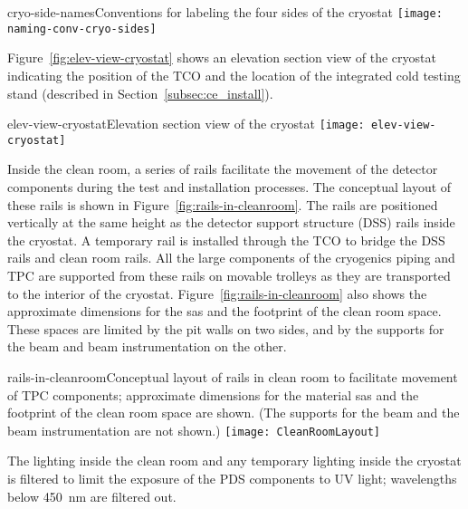 \begin{cdrfigure}{cryo-side-names}{Conventions for labeling the four sides of the cryostat}
\texttt{[image: naming-conv-cryo-sides]}
\end{cdrfigure}

Figure~\ref{fig:elev-view-cryostat} shows an elevation section view of the cryostat indicating the position of the TCO and the location of the integrated cold testing stand (described in Section~\ref{subsec:ce_install}).  

\begin{cdrfigure}{elev-view-cryostat}{Elevation section view of the cryostat}
\texttt{[image: elev-view-cryostat]}
\end{cdrfigure}

Inside the clean room, a series of rails facilitate the movement of the detector components during the test and installation processes.  The conceptual layout of these rails is shown in Figure~\ref{fig:rails-in-cleanroom}.  The rails are positioned vertically at the same height as the detector support structure (DSS) rails inside the cryostat.  A temporary rail is installed through the TCO to bridge the DSS rails and clean room rails.  All the large components of the cryogenics piping and TPC are supported from these rails on movable trolleys as they are transported to the interior of the cryostat.  
Figure~\ref{fig:rails-in-cleanroom} also shows the approximate dimensions for the sas and the footprint of the clean room space.  These spaces are limited by the pit walls on two sides, and by the supports for the beam and beam instrumentation on the other. 


\begin{cdrfigure}{rails-in-cleanroom}{Conceptual layout of rails in clean room to facilitate movement of TPC components; approximate dimensions for the material sas and the footprint of the clean room space are shown. (The supports for the beam and the beam instrumentation are not shown.)}
\texttt{[image: CleanRoomLayout]}
\end{cdrfigure}

The lighting inside the clean room and any temporary lighting inside the cryostat is filtered to limit the exposure of the PDS components to UV light; wavelengths below 450~nm are filtered out. 


